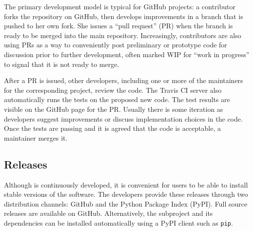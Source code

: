 
The primary development model is typical for GitHub projects: a
contributor forks the repository on GitHub, then develops improvements
in a branch that is pushed to her own fork.  She issues a ``pull
request'' (PR) when the branch is ready to be merged into the main
repository.  Increasingly, contributors are also using PRs as a way to
conveniently post preliminary or prototype code for discussion prior
to further development, often marked WIP for ``work in progress'' to signal
that it is not ready to merge.

After a PR is issued, other developers, including one or more of the
maintainers for the corresponding project, review the code.  The Travis
CI server also automatically runs the tests on the proposed new code.  The test
results are visible on the GitHub page for the PR.  Usually there is
some iteration as developers suggest improvements or discuss
implementation choices in the code.  Once the tests are passing and it
is agreed that the code is acceptable, a maintainer merges it.


\subsection{Releases}

Although \clawpack is continuously developed, it is convenient for
users to be able to install stable versions of the software.  The
\clawpack developers provide these releases through two distribution
channels: GitHub and the Python Package Index (PyPI).  Full source
releases are available on GitHub.  Alternatively, the \pyclaw
subproject and its dependencies can be installed automatically using a
PyPI client such as \texttt{pip}.

